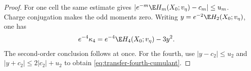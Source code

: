 \begin{proof}
For one cell the same estimate gives
$|e^{-m}\E H_m(X_0;v_\eta)-c_m|\le u_m$.
Charge conjugation makes the odd moments zero.
Writing $y=e^{-2}\E H_2(X_0;v_\eta)$, one has
\[
 e^{-4}\kappa_4=e^{-4}\E H_4(X_0;v_\eta)-3y^2.
\]
The second-order conclusion follows at once.
For the fourth, use $|y-c_2|\le u_2$ and
$|y+c_2|\le2|c_2|+u_2$ to obtain
\eqref{eq:transfer-fourth-cumulant}.
\end{proof}

